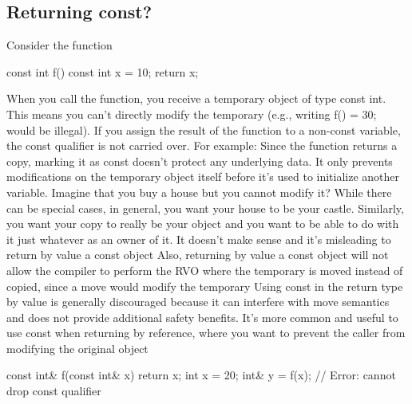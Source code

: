 \documentclass{report}
\begin{document}
\subsection{Returning const?}
\bigbreak \noindent 
Consider the function
\bigbreak \noindent 
\begin{cppcode}
    const int f() {
        const int x = 10;
        return x;
    }
\end{cppcode}
\bigbreak \noindent 
When you call the function, you receive a temporary object of type const int. This means you can’t directly modify the temporary (e.g., writing f() = 30; would be illegal).
\bigbreak \noindent 
If you assign the result of the function to a non-const variable, the const qualifier is not carried over. For example:
\bigbreak \noindent 
Since the function returns a copy, marking it as const doesn’t protect any underlying data. It only prevents modifications on the temporary object itself before it’s used to initialize another variable.
\bigbreak \noindent 
Imagine that you buy a house but you cannot modify it? While
there can be special cases, in general, you want your house to be
your castle. Similarly, you want your copy to really be your object
and you want to be able to do with it just whatever as an owner of
it.
\bigbreak \noindent 
It doesn’t make sense and it’s misleading to return by value a const object
\bigbreak \noindent 
Also, returning by value a const object will not allow the compiler to perform the RVO where the temporary is moved instead of copied, since a move would modify the temporary
\bigbreak \noindent 
Using const in the return type by value is generally discouraged because it can interfere with move semantics and does not provide additional safety benefits. It’s more common and useful to use const when returning by reference, where you want to prevent the caller from modifying the original object
\bigbreak \noindent 
\begin{cppcode}
    const int& f(const int& x) {
        return x;
    }
    int x = 20;
    int& y = f(x); // Error: cannot drop const qualifier
\end{cppcode}



























    





    
\end{document}
